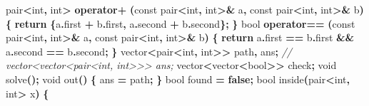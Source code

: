 \documentclass[
]{article}
\newenvironment{Shaded}{\begin{snugshade}}{\end{snugshade}}
\newcommand{\AttributeTok}[1]{\textcolor[rgb]{0.77,0.63,0.00}{#1}}
\newcommand{\CommentTok}[1]{\textcolor[rgb]{0.56,0.35,0.01}{\textit{#1}}}
\newcommand{\ControlFlowTok}[1]{\textcolor[rgb]{0.13,0.29,0.53}{\textbf{#1}}}
\newcommand{\DataTypeTok}[1]{\textcolor[rgb]{0.13,0.29,0.53}{#1}}
\newcommand{\KeywordTok}[1]{\textcolor[rgb]{0.13,0.29,0.53}{\textbf{#1}}}
\newcommand{\NormalTok}[1]{#1}
\newcommand{\OperatorTok}[1]{\textcolor[rgb]{0.81,0.36,0.00}{\textbf{#1}}}
\begin{document}
\begin{Shaded}
\begin{Highlighting}[]
\NormalTok{pair}\OperatorTok{\textless{}}\DataTypeTok{int}\OperatorTok{,} \DataTypeTok{int}\OperatorTok{\textgreater{}} \KeywordTok{operator}\OperatorTok{+} \OperatorTok{(}\AttributeTok{const}\NormalTok{ pair}\OperatorTok{\textless{}}\DataTypeTok{int}\OperatorTok{,} \DataTypeTok{int}\OperatorTok{\textgreater{}\&}\NormalTok{ a}\OperatorTok{,} \AttributeTok{const}\NormalTok{ pair}\OperatorTok{\textless{}}\DataTypeTok{int}\OperatorTok{,} \DataTypeTok{int}\OperatorTok{\textgreater{}\&}\NormalTok{ b}\OperatorTok{)} \OperatorTok{\{}
    \ControlFlowTok{return} \OperatorTok{\{}\NormalTok{a}\OperatorTok{.}\NormalTok{first }\OperatorTok{+}\NormalTok{ b}\OperatorTok{.}\NormalTok{first}\OperatorTok{,}\NormalTok{ a}\OperatorTok{.}\NormalTok{second }\OperatorTok{+}\NormalTok{ b}\OperatorTok{.}\NormalTok{second}\OperatorTok{\};}
\OperatorTok{\}}
\DataTypeTok{bool} \KeywordTok{operator}\OperatorTok{==} \OperatorTok{(}\AttributeTok{const}\NormalTok{ pair}\OperatorTok{\textless{}}\DataTypeTok{int}\OperatorTok{,} \DataTypeTok{int}\OperatorTok{\textgreater{}\&}\NormalTok{ a}\OperatorTok{,} \AttributeTok{const}\NormalTok{ pair}\OperatorTok{\textless{}}\DataTypeTok{int}\OperatorTok{,} \DataTypeTok{int}\OperatorTok{\textgreater{}\&}\NormalTok{ b}\OperatorTok{)} \OperatorTok{\{}
    \ControlFlowTok{return}\NormalTok{ a}\OperatorTok{.}\NormalTok{first }\OperatorTok{==}\NormalTok{ b}\OperatorTok{.}\NormalTok{first }\OperatorTok{\&\&}\NormalTok{ a}\OperatorTok{.}\NormalTok{second }\OperatorTok{==}\NormalTok{ b}\OperatorTok{.}\NormalTok{second}\OperatorTok{;}
\OperatorTok{\}}
\NormalTok{vector}\OperatorTok{\textless{}}\NormalTok{pair}\OperatorTok{\textless{}}\DataTypeTok{int}\OperatorTok{,} \DataTypeTok{int}\OperatorTok{\textgreater{}\textgreater{}}\NormalTok{ path}\OperatorTok{,}\NormalTok{ ans}\OperatorTok{;}
\CommentTok{// vector\textless{}vector\textless{}pair\textless{}int, int\textgreater{}\textgreater{}\textgreater{} ans;}
\NormalTok{vector}\OperatorTok{\textless{}}\NormalTok{vector}\OperatorTok{\textless{}}\DataTypeTok{bool}\OperatorTok{\textgreater{}\textgreater{}}\NormalTok{ check}\OperatorTok{;}
\DataTypeTok{void}\NormalTok{ solve}\OperatorTok{();}
\DataTypeTok{void}\NormalTok{ out}\OperatorTok{()} \OperatorTok{\{}
\NormalTok{    ans }\OperatorTok{=}\NormalTok{ path}\OperatorTok{;}
\OperatorTok{\}}
\DataTypeTok{bool}\NormalTok{ found }\OperatorTok{=} \KeywordTok{false}\OperatorTok{;}
\DataTypeTok{bool}\NormalTok{ inside}\OperatorTok{(}\NormalTok{pair}\OperatorTok{\textless{}}\DataTypeTok{int}\OperatorTok{,} \DataTypeTok{int}\OperatorTok{\textgreater{}}\NormalTok{ x}\OperatorTok{)} \OperatorTok{\{}

\end{Highlighting}
\end{Shaded}
\end{document}
